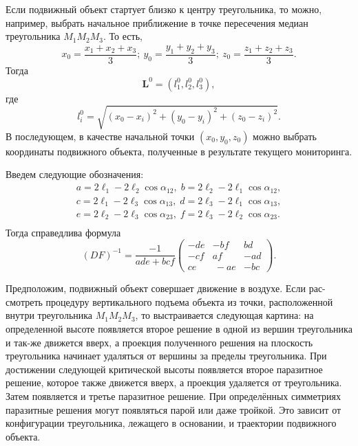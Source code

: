 \documentclass[../main.tex]{subfiles}
\begin{document}
Если подвижный объект стартует близко к центру треугольника, то можно, например, выбрать начальное приближение в точке пересечения медиан треугольника $M_1 M_2 M_3$. То есть,
\begin{equation*}
  x_{0} = \frac{x_1 + x_2 + x_3}{3};\
  y_{0} = \frac{y_1 + y_2 + y_3}{3};\
  z_{0} = \frac{z_1 + z_2 + z_3}{3}.
\end{equation*}
Тогда
\begin{equation*}
  \mathbf{L}^0 = \left(l_1^0, l_2^0, l_3^0\right),
\end{equation*}
где
\begin{equation*}
  l_i^0 = \sqrt{\left(x_0 - x_i\right)^2 + \left(y_0 - y_i\right)^2 + \left(z_0 - z_i\right)^2}.
\end{equation*}
В последующем, в качестве начальной точки $\left(x_0, y_0, z_0\right)$ можно выбрать координаты подвижного объекта, полученные в результате текущего мониторинга.

Введем следующие обозначения:
\begin {equation}
  \begin {matrix}
   a= 2\ell_1 - 2\ell_2 \cos \alpha_{12}, \; b= 2\ell_2 - 2\ell_1 \cos \alpha_{12}, \\
   c= 2\ell_1 - 2\ell_3 \cos \alpha_{13}, \; d= 2\ell_3 - 2\ell_1 \cos \alpha_{13}, \\
   e= 2\ell_2 - 2\ell_3 \cos \alpha_{23}, \; f= 2\ell_3 - 2\ell_2 \cos \alpha_{23}. \\
  \end {matrix}
  \label {abc}
\end {equation}
Тогда справедлива формула
\begin{equation}
  (DF)^{-1} = \frac {-1} {ade+bcf}
  \left(
    \begin{array}{ccc}
      -de & -bf & bd \\
      -cf &  af & -ad \\
      ce  &\ -ae & -bc
    \end{array}
  \right) .
\label {DF_m1}
\end{equation}

Предположим, подвижный объект совершает движение в воздухе. Если рас-смотреть процедуру вертикального подъема объекта из точки, расположенной внутри треугольника $M_1 M_2 M_3$, то выстраивается следующая картина: на определенной высоте появляется второе решение в одной из вершин треугольника и так-же движется вверх, а проекция полученного решения на плоскость треугольника начинает удаляться от вершины за пределы треугольника. При достижении следующей критической высоты появляется второе паразитное решение, которое также движется вверх, а проекция удаляется от треугольника. Затем появляется и третье паразитное решение. При определённых симметриях паразитные решения могут появляться парой или даже тройкой. Это зависит от конфигурации треугольника, лежащего в основании, и траектории подвижного объекта.
\end{document}
